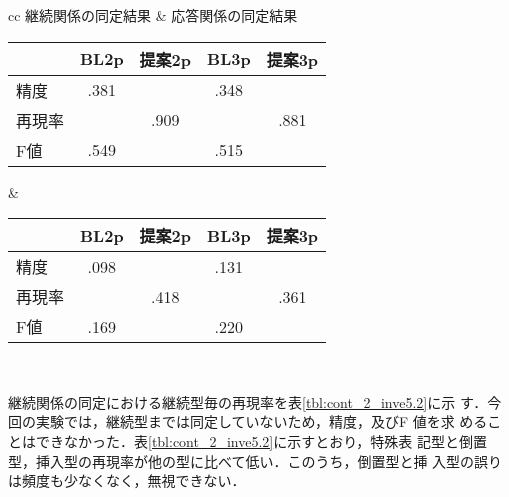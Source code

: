 \begin{table*}[tbt]
\small
  \begin{center}
    \caption{継続関係及び応答関係の同定結果}
    \label{tbl:result2}
  \begin{tabular}{cc}
    継続関係の同定結果 &
    応答関係の同定結果 \\
    \begin{tabular}{|l|c|c||c|c|}
      \hline
       & BL2p & 提案2p & BL3p & 提案3p \\
      \hline
      精度 & .381 & \boldmath{$.914$} & .348 & \boldmath{$.927$}\\
      再現率 & \boldmath{$.985$} & .909 & \boldmath{$.986$} & .881\\
      F値 & .549 & \boldmath{$.912$} & .515 & \boldmath{$.903$}\\
      \hline
    \end{tabular} &
    \begin{tabular}{|l|c|c||c|c|}
      \hline
       & BL2p & 提案2p & BL3p & 提案3p \\
      \hline
      精度 & .098 & \boldmath{$.743$} & .131 & \boldmath{$.743$}\\
      再現率 & \boldmath{$.613$} & .418 & \boldmath{$.682$} & .361\\
      F値 & .169 & \boldmath{$.535$} & .220 & \boldmath{$.486$}\\
      \hline
     \end{tabular}\\
  \end{tabular}
  \end{center}
\end{table*}

継続関係の同定における継続型毎の再現率を表\ref{tbl:cont_2_inve5.2}に示
す．今回の実験では，継続型までは同定していないため，精度，及びF 値を求
めることはできなかった．表\ref{tbl:cont_2_inve5.2}に示すとおり，特殊表
記型と倒置型，挿入型の再現率が他の型に比べて低い．このうち，倒置型と挿
入型の誤りは頻度も少なくなく，無視できない．


